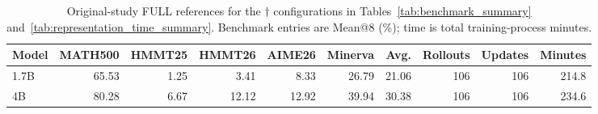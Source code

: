 \begin{table}[!t]
\centering
\caption{Original-study FULL references for the $\dagger$ configurations in Tables~\ref{tab:benchmark_summary} and~\ref{tab:representation_time_summary}. Benchmark entries are Mean@8 (\%); time is total training-process minutes. }
\label{tab:reference_full}
\small
\setlength{\tabcolsep}{4pt}
\renewcommand{\arraystretch}{1.12}
\begin{tabular}{lrrrrrrrrr}
\toprule
Model & MATH500 & HMMT25 & HMMT26 & AIME26 & Minerva & Avg. & Rollouts & Updates & Minutes \\
\midrule
1.7B & 65.53 & 1.25 & 3.41 & 8.33 & 26.79 & 21.06 & 106 & 106 & 214.8 \\
4B & 80.28 & 6.67 & 12.12 & 12.92 & 39.94 & 30.38 & 106 & 106 & 234.6 \\
\bottomrule
\end{tabular}
\end{table}
